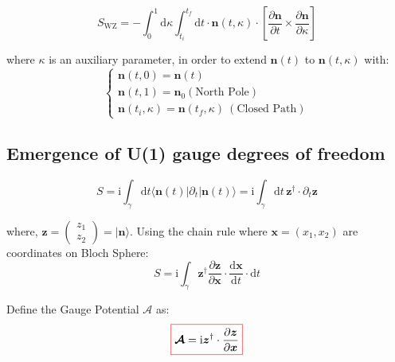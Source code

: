 \begin{theorem}

    \begin{equation}
    S_{\mathrm{WZ}} = -\int_{0}^{1} \mathrm{d}\kappa \int_{t_i}^{t_f} \mathrm{d}t \cdot \bm{n}(t, \kappa) \cdot \left[ \frac{\partial \bm{n}}{\partial t} \times \frac{\partial \bm{n}}{\partial \kappa} \right]
    \end{equation}

    where $\kappa$ is an auxiliary parameter, in order to extend $\bm{n}(t)$ to $\bm{n}(t, \kappa)$ with:
    \begin{equation}
    \begin{cases}
    \bm{n}(t, 0) = \bm{n}(t) \\
    \bm{n}(t, 1) = \bm{n}_0 (\text{North Pole}) \\
    \bm{n}(t_i, \kappa) = \bm{n}(t_f, \kappa) \ (\text{Closed Path})
    \end{cases}
    \end{equation}

\end{theorem}

\subsection{Emergence of U(1) gauge degrees of freedom}

\begin{equation}
S = \mathrm{i} \int_{\gamma} \mathrm{d}t \langle \bm{n}(t) | \partial_t | \bm{n}(t) \rangle = \mathrm{i} \int_{\gamma} \mathrm{d}t \, \bm{z}^{\dagger} \cdot \partial_t \bm{z}
\end{equation}

where, $\bm{z} = \begin{pmatrix} z_1 \\ z_2 \end{pmatrix} = |\bm{n}\rangle$.
Using the chain rule where $\bm{x} = (x_1, x_2)$ are coordinates on Bloch Sphere:
\begin{equation}
S = \mathrm{i} \int_{\gamma} \bm{z}^{\dagger} \frac{\partial \bm{z}}{\partial \bm{x}} \cdot \frac{\mathrm{d}\bm{x}}{\mathrm{d}t} \cdot \mathrm{d}t
\end{equation}

Define the Gauge Potential $\bm{\mathcal{A}}$ as:
\begin{equation}
    \colorboxed{
    \bm{\mathcal{A}} = \mathrm{i} \bm{z}^{\dagger} \cdot \frac{\partial \bm{z}}{\partial \bm{x}}
    }
\end{equation}

